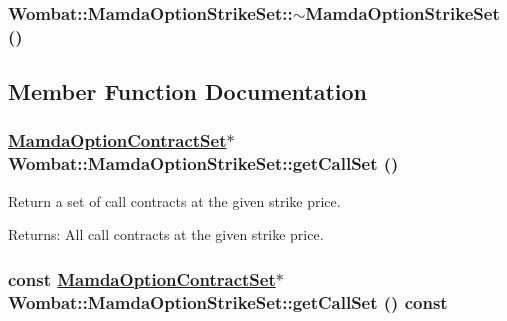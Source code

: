 \hypertarget{classWombat_1_1MamdaOptionStrikeSet_f37e76aea47c9c23f9ba2a0c5c2a6d6f}{
\subsubsection[$\sim$MamdaOptionStrikeSet]{\setlength{\rightskip}{0pt plus 5cm}Wombat::Mamda\-Option\-Strike\-Set::$\sim$Mamda\-Option\-Strike\-Set ()}}
\label{classWombat_1_1MamdaOptionStrikeSet_f37e76aea47c9c23f9ba2a0c5c2a6d6f}




\subsection{Member Function Documentation}
\hypertarget{classWombat_1_1MamdaOptionStrikeSet_54ca15944e44eb147527c1c606e9624f}{
\subsubsection[getCallSet]{\setlength{\rightskip}{0pt plus 5cm}\hyperlink{classWombat_1_1MamdaOptionContractSet}{Mamda\-Option\-Contract\-Set}$\ast$ Wombat::Mamda\-Option\-Strike\-Set::get\-Call\-Set ()}}
\label{classWombat_1_1MamdaOptionStrikeSet_54ca15944e44eb147527c1c606e9624f}


Return a set of call contracts at the given strike price. 

\begin{Desc}
\item[Returns:]All call contracts at the given strike price. \end{Desc}
\hypertarget{classWombat_1_1MamdaOptionStrikeSet_59c81546d87ef3569a9cfec1657752e0}{
\subsubsection[getCallSet]{\setlength{\rightskip}{0pt plus 5cm}const \hyperlink{classWombat_1_1MamdaOptionContractSet}{Mamda\-Option\-Contract\-Set}$\ast$ Wombat::Mamda\-Option\-Strike\-Set::get\-Call\-Set () const}}
\label{classWombat_1_1MamdaOptionStrikeSet_59c81546d87ef3569a9cfec1657752e0}


